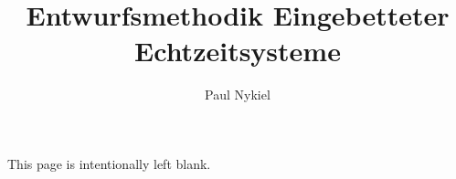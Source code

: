 \documentclass[10pt]{report}
\title{Entwurfsmethodik Eingebetteter Echtzeitsysteme}
\author{Paul Nykiel}
\begin{document}
    \maketitle
    \pagebreak
    This page is intentionally left blank.
    \pagebreak
    \tableofcontents
    \pagebreak
    
    
    
    

    \appendix
\end{document}
